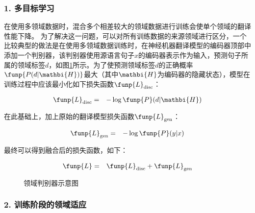 \subsubsection{1. 多目标学习}

\parinterval 在使用多领域数据时，混合多个相差较大的领域数据进行训练会使单个领域的翻译性能下降。 为了解决这一问题，可以对所有训练数据的来源领域进行区分，一个比较典型的做法是在使用多领域数据训练时，在神经机器翻译模型的编码器顶部中添加一个判别器，该判别器使用源语言句子$x$的编码器表示作为输入，预测句子所属的领域标签$d$，如图\ref{fig:16-21}所示。为了使预测领域标签$d$的正确概率$\funp{P(d|\mathbi{H})}$最大（其中$\mathbi{H}$为编码器的隐藏状态），模型在训练过程中应该最小化如下损失函数$\funp{L}_{\rm{disc}}$：

\begin{eqnarray}
\funp{L}_{\rm{disc}}& = &-\log\funp{P}(d|\mathbi{H})
\label{eq:16-10}
\end{eqnarray}

\noindent 在此基础上，加上原始的翻译模型损失函数$\funp{L}_{\rm{gen}}$：

\begin{eqnarray}
\funp{L}_{\rm{gen}}& = & -\log\funp{P}(y|x)\label{eq:16-11}
\end{eqnarray}

\noindent 最终可以得到融合后的损失函数，如下：

\begin{eqnarray}
\funp{L} & = & \funp{L}_{\rm{disc}}+\funp{L}_{\rm{gen}}\label{eq:16-12}
\end{eqnarray}


\begin{figure}[h]
\centering

\caption{领域判别器示意图}
\label{fig:16-21}
\end{figure}

\subsubsection{2. 训练阶段的领域适应}

